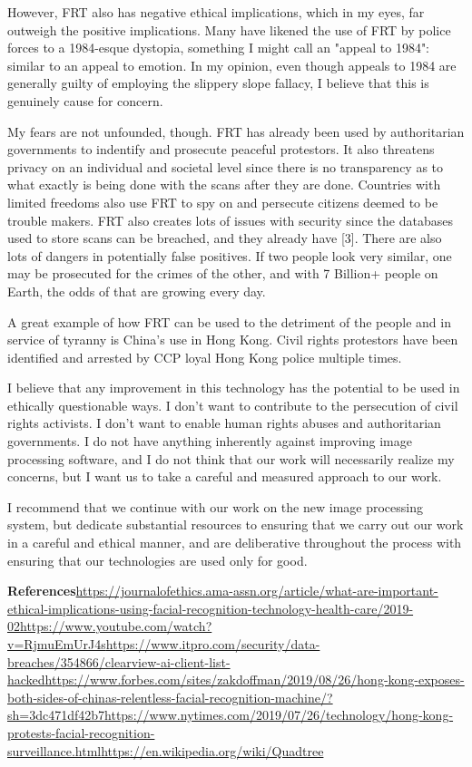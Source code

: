 \documentclass{article}
\begin{document}
However, FRT also has negative ethical implications, which in my eyes, far outweigh the positive implications.
Many have likened the use of FRT by police forces to a 1984-esque dystopia, something I might call an "appeal to 1984": similar to an appeal to emotion.
In my opinion, even though appeals to 1984 are generally guilty of employing the slippery slope fallacy, I believe
that this is genuinely cause for concern.

My fears are not unfounded, though. FRT has already been used by authoritarian governments to indentify and prosecute peaceful protestors.
It also threatens privacy on an individual and societal level since there is no transparency as to what exactly is being done with the scans
after they are done. Countries with limited freedoms also use FRT to spy on and persecute citizens deemed to be trouble makers.
FRT also creates lots of issues with security since the databases used to store scans can be breached, and they already have [3].
There are also lots of dangers in potentially false positives. If two people look very similar, one may be prosecuted for the crimes
of the other, and with 7 Billion+ people on Earth, the odds of that are growing every day.

A great example of how FRT can be used to the detriment of the people and in service of tyranny is China's use in Hong Kong.
Civil rights protestors have been identified and arrested by CCP loyal Hong Kong police multiple times.

I believe that any improvement in this technology has the potential to be used in ethically questionable ways.
I don't want to contribute to the persecution of civil rights activists. I don't want to enable human rights abuses and authoritarian governments.
I do not have anything inherently against improving image processing software, and I do not think that our work
will necessarily realize my concerns, but I want us to take a careful and measured approach to our work.

I recommend that we continue with our work on the new image processing system, but dedicate substantial resources
to ensuring that we carry out our work in a careful and ethical manner, and are deliberative throughout
the process with ensuring that our technologies are used only for good.

\textbf{References}\newline
[1] \url{https://journalofethics.ama-assn.org/article/what-are-important-ethical-implications-using-facial-recognition-technology-health-care/2019-02}\newline
[2] \url{https://www.youtube.com/watch?v=RjmuEmUrJ4s}\newline
[3] \url{https://www.itpro.com/security/data-breaches/354866/clearview-ai-client-list-hacked}\newline
[4] \url{https://www.forbes.com/sites/zakdoffman/2019/08/26/hong-kong-exposes-both-sides-of-chinas-relentless-facial-recognition-machine/?sh=3dc471df42b7}\newline
[5] \url{https://www.nytimes.com/2019/07/26/technology/hong-kong-protests-facial-recognition-surveillance.html}\newline
[6] \url{https://en.wikipedia.org/wiki/Quadtree}
\end{document}
